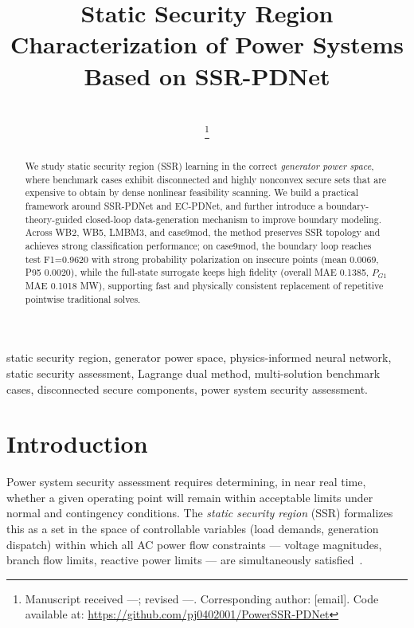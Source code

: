 \documentclass[journal]{IEEEtran}
\title{Static Security Region Characterization of Power Systems Based on SSR-PDNet}
\author{
  \IEEEauthorblockN{Peng Jiao}\\
  \IEEEauthorblockA{[Institution]}
  \thanks{Manuscript received ---; revised ---.
  Corresponding author: [email].
  Code available at: \url{https://github.com/pj0402001/PowerSSR-PDNet}}
}
\begin{document}
\maketitle

\begin{abstract}
We study static security region (SSR) learning in the correct \emph{generator power space}, where benchmark cases exhibit disconnected and highly nonconvex secure sets that are expensive to obtain by dense nonlinear feasibility scanning. We build a practical framework around SSR-PDNet and EC-PDNet, and further introduce a boundary-theory-guided closed-loop data-generation mechanism to improve boundary modeling. Across WB2, WB5, LMBM3, and case9mod, the method preserves SSR topology and achieves strong classification performance; on case9mod, the boundary loop reaches test F1=0.9620 with strong probability polarization on insecure points (mean 0.0069, P95 0.0020), while the full-state surrogate keeps high fidelity (overall MAE 0.1385, $P_{G1}$ MAE 0.1018 MW), supporting fast and physically consistent replacement of repetitive pointwise traditional solves.
\end{abstract}

\begin{IEEEkeywords}
static security region, generator power space,
physics-informed neural network, static security assessment,
Lagrange dual method, multi-solution benchmark cases, disconnected secure components,
power system security assessment.
\end{IEEEkeywords}

\section{Introduction}
\label{sec:intro}

Power system security assessment requires determining, in near real time,
whether a given operating point will remain within acceptable limits under
normal and contingency conditions. The \emph{static security region} (SSR)
formalizes this as a set in the space of controllable variables (load demands,
generation dispatch) within which all AC power flow constraints — voltage
magnitudes, branch flow limits, reactive power limits — are simultaneously
satisfied~\cite{jiang2017feasibility}.
\end{document}
